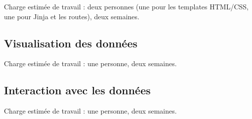 \documentclass[12pt]{article}
\begin{document}
	Charge estimée de travail : deux personnes (une pour les templates HTML/CSS, une pour Jinja et les routes), deux semaines.
	
	\subsection*{Visualisation des données}
	
	Charge estimée de travail : une personne, deux semaines.
	
	\subsection*{Interaction avec les données}
	
	Charge estimée de travail : une personne, deux semaines.
	
	
	
	
	
	
	
	
	
	
	
	
	
	
	
	
	
	
	
	

	

	
\end{document}
